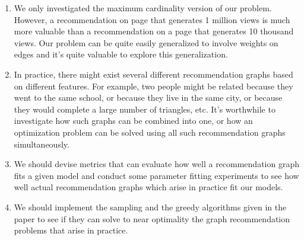 \documentclass[]{article}
\begin{document}
\begin{enumerate}
\item We only investigated the maximum cardinality version of our
  problem. However, a recommendation on page that generates 1 million
  views is much more valuable than a recommendation on a page that
  generates 10 thousand views. Our problem can be quite easily
  generalized to involve weights on edges and it's quite valuable
  to explore this generalization.

\item In practice, there might exist several different
  recommendation graphs based on different features. For example,
  two people might be related because they went to the same 
  school, or because they live in the same city, or because they
  would complete a large number of triangles, etc. It's worthwhile
  to investigate how such graphs can be combined into one, or how
  an optimization problem can be solved using all such 
  recommendation graphs simultaneously.

\item We should devise metrics that can evaluate how well a
  recommendation graph fits a given model and conduct some parameter
  fitting experiments to see how well actual recommendation graphs
  which arise in practice fit our models.

\item We should implement the sampling and the greedy algorithms
  given in the paper to see if they can solve to near optimality
  the graph recommendation problems that arise in practice.
\end{enumerate}
\end{document}
